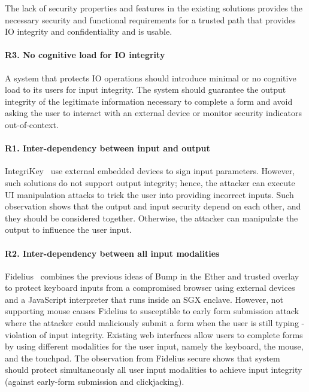 The lack of security properties and features in the existing solutions provides the necessary security and functional requirements for a trusted path that provides IO integrity and confidentiality and is usable. 

\paragraph{R3. No cognitive load for IO integrity} 
A system that protects IO operations should introduce minimal or no cognitive load to its users for input integrity.
The system should guarantee the output integrity of the legitimate information necessary to complete a form and avoid asking the user to interact with an external device or monitor security indicators out-of-context.


\paragraph{R1. Inter-dependency between input and output} 
IntegriKey~\cite{IntegriKey} use external embedded devices to sign input parameters. However, such solutions do not support output integrity; hence, the attacker can execute UI manipulation attacks to trick the user into providing incorrect inputs. Such observation shows that the output and input security depend on each other, and they should be considered together. Otherwise, the attacker can manipulate the output to influence the user input.


\paragraph{R2. Inter-dependency between all input modalities} 
Fidelius~\cite{Fidelius} combines the previous ideas of Bump in the Ether and trusted overlay to protect keyboard inputs from a compromised browser using external devices and a JavaScript interpreter that runs inside an SGX enclave. However, not supporting mouse causes Fidelius to susceptible to early form submission attack where the attacker could maliciously submit a form when the user is still typing - violation of input integrity. Existing web interfaces allow users to complete forms by using different modalities for the user input, namely the keyboard, the mouse, and the touchpad. The observation from Fidelius secure shows that system should protect simultaneously all user input modalities to achieve input integrity (against early-form submission and clickjacking).


